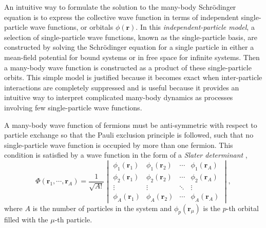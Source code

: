 \documentclass[thesis.tex]{subfiles}
\begin{document}
An intuitive way to formulate the solution to the many-body Schr\"{o}dinger equation is to express the collective wave function in terms of independent single-particle wave functions, or orbitals $\phi\left(\mathbf{r}\right)$.  In this \textit{independent-particle model}, a selection of single-particle wave functions, known as the single-particle basis, are constructed by solving the Schr\"{o}dinger equation for a single particle in either a mean-field potential for bound systems or in free space for infinite systems.  Then a many-body wave function is constructed as a product of these single-particle orbits.  This simple model is justified because it becomes exact when inter-particle interactions are completely suppressed and is useful because it provides an intuitive way to interpret complicated many-body dynamics as processes involving few single-particle wave functions.

A many-body wave function of fermions must be anti-symmetric with respect to particle exchange so that the Pauli exclusion principle is followed, such that no single-particle wave function is occupied by more than one fermion.  This condition is satisfied by a wave function in the form of a \textit{Slater determinant} \cite{SLATER1929},
\begin{equation} \label{eq:slaterdeterminant}
  \Phi\left(\mathbf{r}_{1},\cdots,\mathbf{r}_{A}\right) =
  \frac{1}{\sqrt{A!}}\begin{vmatrix}
    \phi_{1}\left(\mathbf{r}_{1}\right) & \phi_{1}\left(\mathbf{r}_{2}\right) & \cdots & \phi_{1}\left(\mathbf{r}_{A}\right) \\
    \phi_{2}\left(\mathbf{r}_{1}\right) & \phi_{2}\left(\mathbf{r}_{2}\right) & \cdots & \phi_{2}\left(\mathbf{r}_{A}\right) \\
    \vdots & \vdots & \ddots & \vdots \\
    \phi_{A}\left(\mathbf{r}_{1}\right) & \phi_{A}\left(\mathbf{r}_{2}\right) & \cdots & \phi_{A}\left(\mathbf{r}_{A}\right)
  \end{vmatrix},
\end{equation}
where $A$ is the number of particles in the system and $\phi_{p}\left(\mathbf{r}_{\mu}\right)$ is the $p$-th orbital filled with the $\mu$-th particle.
\end{document}
